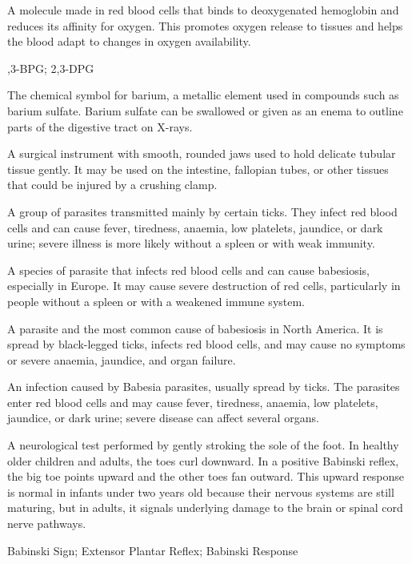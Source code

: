  A molecule made in red blood cells that binds to deoxygenated hemoglobin and reduces its affinity for oxygen. This promotes oxygen release to tissues and helps the blood adapt to changes in oxygen availability.

,3-BPG; 2,3-DPG

 The chemical symbol for barium, a metallic element used in compounds such as barium sulfate. Barium sulfate can be swallowed or given as an enema to outline parts of the digestive tract on X-rays.

 A surgical instrument with smooth, rounded jaws used to hold delicate tubular tissue gently. It may be used on the intestine, fallopian tubes, or other tissues that could be injured by a crushing clamp.

 A group of parasites transmitted mainly by certain ticks. They infect red blood cells and can cause fever, tiredness, anaemia, low platelets, jaundice, or dark urine; severe illness is more likely without a spleen or with weak immunity.

 A species of parasite that infects red blood cells and can cause babesiosis, especially in Europe. It may cause severe destruction of red cells, particularly in people without a spleen or with a weakened immune system.

 A parasite and the most common cause of babesiosis in North America. It is spread by black-legged ticks, infects red blood cells, and may cause no symptoms or severe anaemia, jaundice, and organ failure.

 An infection caused by Babesia parasites, usually spread by ticks. The parasites enter red blood cells and may cause fever, tiredness, anaemia, low platelets, jaundice, or dark urine; severe disease can affect several organs.

 A neurological test performed by gently stroking the sole of the foot. In healthy older children and adults, the toes curl downward. In a positive Babinski reflex, the big toe points upward and the other toes fan outward. This upward response is normal in infants under two years old because their nervous systems are still maturing, but in adults, it signals underlying damage to the brain or spinal cord nerve pathways.

\synonyms
Babinski Sign; Extensor Plantar Reflex; Babinski Response

